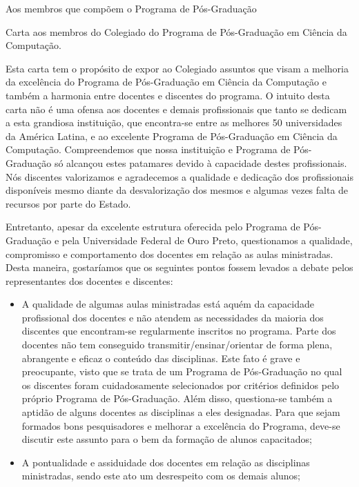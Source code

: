 \documentclass[11pt]{letter}
\date{29 de julho de 2016}
\begin{document}
\begin{letter}{Aos membros que compõem o Programa de Pós-Graduação}
\opening{Carta aos membros do Colegiado do Programa de Pós-Graduação em Ciência da Computação.}

Esta carta tem o propósito de expor ao Colegiado assuntos que visam a melhoria da excelência do Programa de Pós-Graduação em Ciência da Computação e também a harmonia entre docentes e discentes do programa. O intuito desta carta não é uma ofensa aos docentes e demais profissionais que tanto se dedicam a esta grandiosa instituição, que encontra-se entre as melhores 50 universidades da América Latina, e ao excelente Programa de Pós-Graduação em Ciência da Computação. Compreendemos que nossa instituição e Programa de Pós-Graduação só alcançou estes patamares devido à capacidade destes profissionais. Nós discentes valorizamos e agradecemos a qualidade e dedicação dos profissionais disponíveis mesmo diante da desvalorização dos mesmos e algumas vezes falta de recursos por parte do Estado.

Entretanto, apesar da excelente estrutura oferecida pelo Programa de Pós-Graduação e pela Universidade Federal de Ouro Preto, questionamos a qualidade, compromisso e comportamento dos docentes em relação as aulas ministradas. Desta maneira, gostaríamos que os seguintes pontos fossem levados a debate pelos representantes dos docentes e discentes:


\begin{itemize}
	\item A qualidade de algumas aulas ministradas está aquém da capacidade profissional dos docentes e não atendem as necessidades da maioria dos discentes que encontram-se regularmente inscritos no programa. Parte dos docentes não tem conseguido transmitir/ensinar/orientar de forma plena, abrangente e eficaz o conteúdo das disciplinas. Este fato é grave e preocupante, visto que se trata de um Programa de Pós-Graduação no qual os discentes foram cuidadosamente selecionados por critérios definidos pelo próprio Programa de Pós-Graduação. Além disso, questiona-se também a aptidão de alguns docentes as disciplinas a eles designadas. Para que sejam formados bons pesquisadores e melhorar a excelência do Programa, deve-se discutir este assunto para o bem da formação de alunos capacitados;
    
    \item A pontualidade e assiduidade dos docentes em relação as disciplinas ministradas, sendo este ato um desrespeito com os demais alunos;


\end{itemize}
\end{letter}
\end{document}
